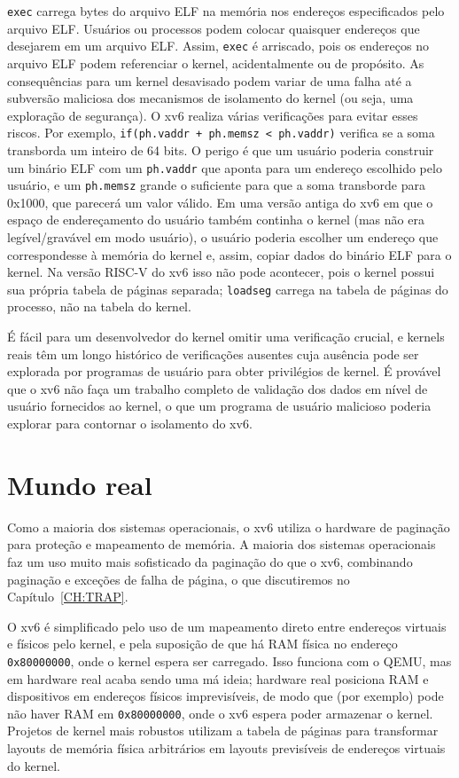 \lstinline{exec} carrega bytes do arquivo ELF na memória nos endereços especificados pelo arquivo ELF.  
Usuários ou processos podem colocar quaisquer endereços que desejarem em um arquivo ELF.  
Assim, \lstinline{exec} é arriscado, pois os endereços no arquivo ELF podem referenciar o kernel, acidentalmente ou de propósito.  
As consequências para um kernel desavisado podem variar de uma falha até a subversão maliciosa dos mecanismos de isolamento do kernel (ou seja, uma exploração de segurança).  
O xv6 realiza várias verificações para evitar esses riscos.  
Por exemplo, \lstinline{if(ph.vaddr + ph.memsz < ph.vaddr)} verifica se a soma transborda um inteiro de 64 bits.  
O perigo é que um usuário poderia construir um binário ELF com um \lstinline{ph.vaddr} que aponta para um endereço escolhido pelo usuário,  
e um \lstinline{ph.memsz} grande o suficiente para que a soma transborde para 0x1000, que parecerá um valor válido.  
Em uma versão antiga do xv6 em que o espaço de endereçamento do usuário também continha o kernel (mas não era legível/gravável em modo usuário),  
o usuário poderia escolher um endereço que correspondesse à memória do kernel e, assim, copiar dados do binário ELF para o kernel.  
Na versão RISC-V do xv6 isso não pode acontecer, pois o kernel possui sua própria tabela de páginas separada;  
\lstinline{loadseg} carrega na tabela de páginas do processo, não na tabela do kernel.

É fácil para um desenvolvedor do kernel omitir uma verificação crucial,  
e kernels reais têm um longo histórico de verificações ausentes cuja ausência pode ser explorada por programas de usuário para obter privilégios de kernel.  
É provável que o xv6 não faça um trabalho completo de validação dos dados em nível de usuário fornecidos ao kernel,  
o que um programa de usuário malicioso poderia explorar para contornar o isolamento do xv6.

\section{Mundo real}

Como a maioria dos sistemas operacionais, o xv6 utiliza o hardware de paginação para proteção e mapeamento de memória. A maioria dos sistemas operacionais faz um uso muito mais sofisticado da 
paginação do que o xv6, combinando paginação e exceções de falha de página, o que discutiremos no Capítulo~\ref{CH:TRAP}.

O xv6 é simplificado pelo uso de um mapeamento direto entre endereços virtuais e físicos pelo kernel, e pela suposição de que há RAM física no endereço \lstinline{0x80000000}, onde o kernel espera 
ser carregado. Isso funciona com o QEMU, mas em hardware real acaba sendo uma má ideia; hardware real posiciona RAM e dispositivos em endereços físicos imprevisíveis, de modo que (por exemplo) pode 
não haver RAM em \lstinline{0x80000000}, onde o xv6 espera poder armazenar o kernel. Projetos de kernel mais robustos utilizam a tabela de páginas para transformar layouts de memória física 
arbitrários em layouts previsíveis de endereços virtuais do kernel.

